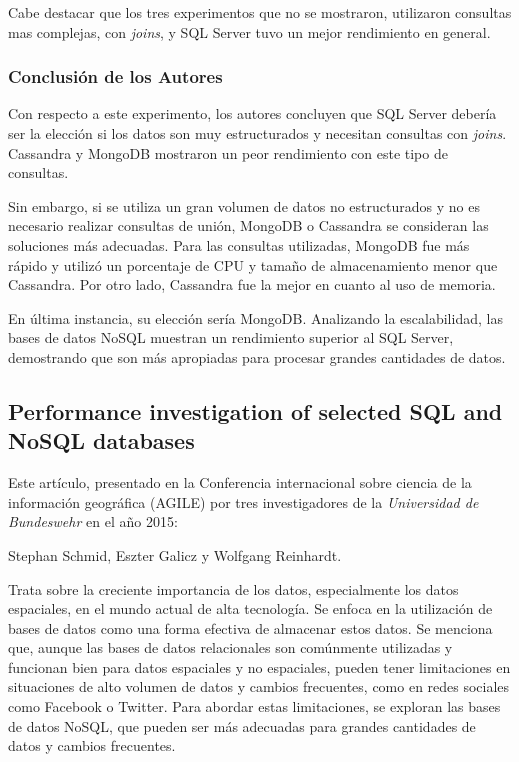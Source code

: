 \documentclass[pdflatex,sn-mathphys-num]{sn-jnl}
\theoremstyle{thmstyleone}%
\theoremstyle{thmstyletwo}%
\theoremstyle{thmstylethree}%
\begin{document}
Cabe destacar que los tres experimentos que no se mostraron, utilizaron consultas mas complejas, con \textit{joins}, y SQL Server tuvo un mejor rendimiento en general. 

\subsubsection{Conclusión de los Autores}\label{sec512}

Con respecto a este experimento, los autores concluyen que SQL Server debería ser la elección si los datos son muy estructurados y necesitan consultas con \textit{joins}. Cassandra y MongoDB mostraron un peor rendimiento con este tipo de consultas.

Sin embargo, si se utiliza un gran volumen de datos no estructurados y no es necesario realizar consultas de unión, MongoDB o Cassandra se consideran las soluciones más adecuadas. Para las consultas utilizadas, MongoDB fue más rápido y utilizó un porcentaje de CPU y tamaño de almacenamiento menor que Cassandra. Por otro lado, Cassandra fue la mejor en cuanto al uso de memoria. 

En última instancia, su elección sería MongoDB. Analizando la escalabilidad, las bases de datos NoSQL muestran un rendimiento superior al SQL Server, demostrando que son más apropiadas para procesar grandes cantidades de datos. 

\subsection{Performance investigation of selected SQL and NoSQL databases}\label{sec52}

Este artículo\cite{geo2015}, presentado en la Conferencia internacional sobre ciencia de la información geográfica (AGILE) por tres investigadores de la \textit{Universidad de Bundeswehr} en el año 2015:

\begin{center}
    Stephan Schmid, Eszter Galicz y Wolfgang Reinhardt.
\end{center}

Trata sobre la creciente importancia de los datos, especialmente los datos espaciales, en el mundo actual de alta tecnología. Se enfoca en la utilización de bases de datos como una forma efectiva de almacenar estos datos. Se menciona que, aunque las bases de datos relacionales son comúnmente utilizadas y funcionan bien para datos espaciales y no espaciales, pueden tener limitaciones en situaciones de alto volumen de datos y cambios frecuentes, como en redes sociales como Facebook o Twitter. Para abordar estas limitaciones, se exploran las bases de datos NoSQL, que pueden ser más adecuadas para grandes cantidades de datos y cambios frecuentes.
\end{document}
